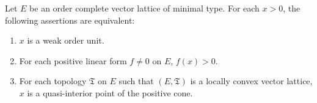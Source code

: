 Let $E$ be an order complete vector lattice of minimal type. For each $x > 0$, the following assertions are equivalent:
\begin{enumerate}
\item[(a)] $x$ is a weak order unit.
\item[(b)] For each positive linear form $f \neq 0$ on $E$, $f(x) > 0$.
\item[(c)] For each topology $\mathfrak{T}$ on $E$ such that $(E, \mathfrak{T})$ is a locally convex vector lattice, $x$ is a quasi-interior point of the positive cone.
\end{enumerate}
